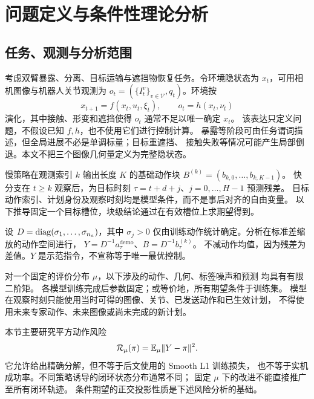 \section{问题定义与条件性理论分析}
\label{sec:theory}

\subsection{任务、观测与分析范围}

考虑双臂暴露、分离、目标运输与遮挡物恢复任务。令环境隐状态为
$x_t$，可用相机图像与机器人关节观测为
$o_t=(\{I_t^v\}_{v\in\mathcal V},q_t)$。环境按
\begin{equation}
 x_{t+1}=f(x_t,u_t,\xi_t),\qquad o_t=h(x_t,\nu_t)
\end{equation}
演化，其中接触、形变和遮挡使得 $o_t$ 通常不足以唯一确定 $x_t$。
该表达只定义问题，不假设已知 $f,h$，也不使用它们进行控制计算。
暴露等阶段可由任务谓词描述，但全局进展不必是单调标量；目标重遮挡、
接触失败等情况可能产生局部倒退。本文不把三个图像几何量定义为完整隐状态。

慢策略在观测索引 $k$ 输出长度 $K$ 的基础动作块
$B^{(k)}=(b_{k,0},\ldots,b_{k,K-1})$。
快分支在 $t\geq k$ 观察后，为目标时刻
$\tau=t+d+j$、$j=0,\ldots,H-1$ 预测残差。
目标动作索引、计划身份及观察时刻均是模型条件，而不是事后对齐的自由变量。
以下推导固定一个目标槽位，块级结论通过在有效槽位上求期望得到。

设 $D=\operatorname{diag}(\sigma_1,\ldots,\sigma_{n_a})$，其中
$\sigma_j>0$ 仅由训练动作统计确定。分析在标准差缩放的动作空间进行，
$Y=D^{-1}a^{\mathrm{demo}}_\tau$、$B=D^{-1}b^{(k)}_\tau$。
不减动作均值，因为残差为差值。$Y$ 是示范指令，不宣称等于唯一最优控制。

\begin{assumption}[固定分布与因果性]
\label{ass:distribution}
对一个固定的评价分布 $\mu$，以下涉及的动作、几何、标签噪声和预测
均具有有限二阶矩。
各模型训练完成后参数固定；或等价地，所有期望条件于训练集。
模型在观察时刻只能使用当时可得的图像、关节、已发送动作和已生效计划，
不得使用未来专家动作、未来图像或尚未完成的新计划。
\end{assumption}

本节主要研究平方动作风险
\begin{equation}
 \mathcal R_\mu(\pi)=\mathbb{E}_\mu\lVert Y-\pi\rVert^2.
 \label{eq:risk}
\end{equation}
它允许给出精确分解，但不等于后文使用的 Smooth L1 训练损失，
也不等于实机成功率。不同策略诱导的闭环状态分布通常不同；
固定 $\mu$ 下的改进不能直接推广至所有闭环轨迹。
条件期望的正交投影性质是下述风险分析的基础\cite{shalizi2020prediction}。


